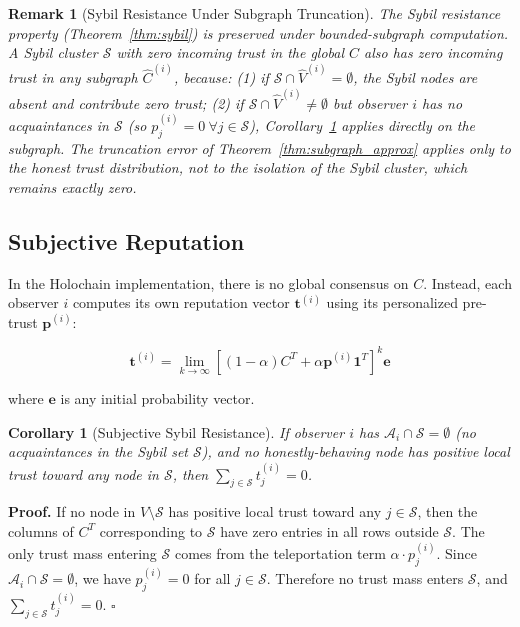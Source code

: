 \documentclass[11pt]{article}
\newtheorem{corollary}[theorem]{Corollary}
\newtheorem{remark}[theorem]{Remark}
\newcommand{\qed}{\hfill}
\newenvironment{proof}{\noindent\textbf{Proof.}}{\qed$\square$\par\medskip}
\begin{document}
\begin{remark}[Sybil Resistance Under Subgraph Truncation]\label{rem:sybil_subgraph}
The Sybil resistance property (Theorem~\ref{thm:sybil}) is preserved under bounded-subgraph computation. A Sybil cluster $\mathcal{S}$ with zero incoming trust in the global $C$ also has zero incoming trust in any subgraph $\hat{C}^{(i)}$, because: (1) if $\mathcal{S} \cap \hat{V}^{(i)} = \emptyset$, the Sybil nodes are absent and contribute zero trust; (2) if $\mathcal{S} \cap \hat{V}^{(i)} \neq \emptyset$ but observer $i$ has no acquaintances in $\mathcal{S}$ (so $p^{(i)}_j = 0\ \forall j \in \mathcal{S}$), Corollary~\ref{cor:subjective_sybil} applies directly on the subgraph. The truncation error of Theorem~\ref{thm:subgraph_approx} applies only to the honest trust distribution, not to the isolation of the Sybil cluster, which remains exactly zero.
\end{remark}

\subsection{Subjective Reputation}

In the Holochain implementation, there is no global consensus on $C$. Instead, each observer $i$ computes its own reputation vector $\mathbf{t}^{(i)}$ using its personalized pre-trust $\mathbf{p}^{(i)}$:

\begin{equation}
    \mathbf{t}^{(i)} = \lim_{k \to \infty} \left[ (1 - \alpha) C^T + \alpha \mathbf{p}^{(i)} \mathbf{1}^T \right]^k \mathbf{e}
\end{equation}

where $\mathbf{e}$ is any initial probability vector.

\begin{corollary}[Subjective Sybil Resistance]\label{cor:subjective_sybil}
If observer $i$ has $\mathcal{A}_i \cap \mathcal{S} = \emptyset$ (no acquaintances in the Sybil set $\mathcal{S}$), and no honestly-behaving node has positive local trust toward any node in $\mathcal{S}$, then $\sum_{j \in \mathcal{S}} t^{(i)}_j = 0$.
\end{corollary}

\begin{proof}
If no node in $V \setminus \mathcal{S}$ has positive local trust toward any $j \in \mathcal{S}$, then the columns of $C^T$ corresponding to $\mathcal{S}$ have zero entries in all rows outside $\mathcal{S}$. The only trust mass entering $\mathcal{S}$ comes from the teleportation term $\alpha \cdot p^{(i)}_j$. Since $\mathcal{A}_i \cap \mathcal{S} = \emptyset$, we have $p^{(i)}_j = 0$ for all $j \in \mathcal{S}$. Therefore no trust mass enters $\mathcal{S}$, and $\sum_{j \in \mathcal{S}} t^{(i)}_j = 0$. \qed
\end{proof}
\end{document}
